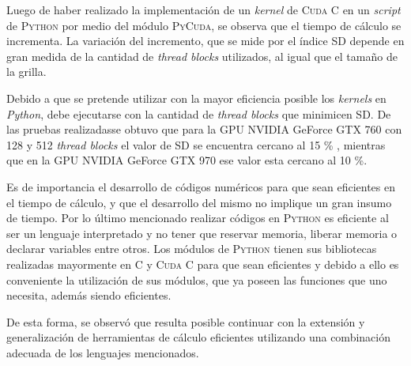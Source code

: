 
\newpage
Luego de haber realizado la implementación de un \textit{kernel} de \textsc{Cuda C} en un \textit{script} de \textsc{Python} por medio del módulo \textsc{PyCuda}, se observa que el tiempo de cálculo se incrementa. La variación del incremento, que se mide por el índice SD depende en gran medida de la cantidad de \textit{thread blocks} utilizados, al igual que el tamaño de la grilla.

Debido a que se pretende utilizar con la mayor eficiencia posible los \textit{kernels} en \textit{Python}, debe ejecutarse con la cantidad de \textit{thread blocks} que minimicen SD. De las pruebas realizadasse obtuvo que para la GPU NVIDIA GeForce GTX 760 con 128 y 512  \textit{thread blocks} el valor de SD se encuentra cercano al 15 \% , mientras que en la GPU NVIDIA GeForce GTX 970 ese valor esta cercano al 10 \%.

Es de importancia el desarrollo de códigos numéricos para que sean eficientes en el tiempo de cálculo, y que el desarrollo del mismo no implique un gran insumo de tiempo. Por lo último mencionado realizar códigos en \textsc{Python} es eficiente al ser un lenguaje interpretado y no tener que reservar memoria, liberar memoria o declarar variables entre otros. Los módulos de \textsc{Python} tienen sus bibliotecas realizadas mayormente en \textsc{C} y \textsc{Cuda C} para que sean eficientes y debido a ello es conveniente la utilización de sus módulos, que ya poseen las funciones que uno necesita, además siendo eficientes. 

De esta forma, se observó que resulta posible continuar con la extensión y generalización de herramientas de cálculo eficientes utilizando una combinación adecuada de los lenguajes mencionados.





